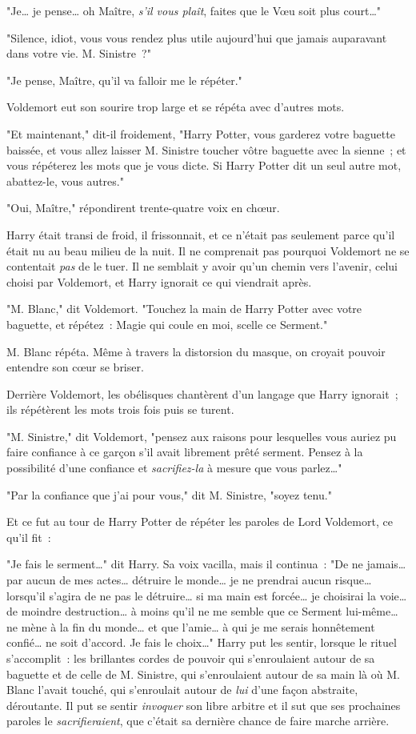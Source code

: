 "Je… je pense… oh Maître, \emph{s'il vous plaît}, faites que le Vœu soit plus court…"

"Silence, idiot, vous vous rendez plus utile aujourd'hui que jamais auparavant dans votre vie. M. Sinistre~?"

"Je pense, Maître, qu'il va falloir me le répéter."

Voldemort eut son sourire trop large et se répéta avec d'autres mots.

"Et maintenant," dit-il froidement, "Harry Potter, vous garderez votre baguette baissée, et vous allez laisser M. Sinistre toucher vôtre baguette avec la sienne~; et vous répéterez les mots que je vous dicte. Si Harry Potter dit un seul autre mot, abattez-le, vous autres."

"Oui, Maître," répondirent trente-quatre voix en chœur.

Harry était transi de froid, il frissonnait, et ce n'était pas seulement parce qu'il était nu au beau milieu de la nuit. Il ne comprenait pas pourquoi Voldemort ne se contentait \emph{pas} de le tuer. Il ne semblait y avoir qu'un chemin vers l'avenir, celui choisi par Voldemort, et Harry ignorait ce qui viendrait après.

"M. Blanc," dit Voldemort. "Touchez la main de Harry Potter avec votre baguette, et répétez~: Magie qui coule en moi, scelle ce Serment."

M. Blanc répéta. Même à travers la distorsion du masque, on croyait pouvoir entendre son cœur se briser.

Derrière Voldemort, les obélisques chantèrent d'un langage que Harry ignorait~; ils répétèrent les mots trois fois puis se turent.

"M. Sinistre," dit Voldemort, "pensez aux raisons pour lesquelles vous auriez pu faire confiance à ce garçon s'il avait librement prêté serment. Pensez à la possibilité d'une confiance et \emph{sacrifiez-la} à mesure que vous parlez…"

"Par la confiance que j'ai pour vous," dit M. Sinistre, "soyez tenu."

Et ce fut au tour de Harry Potter de répéter les paroles de Lord Voldemort, ce qu'il fit~:

"Je fais le serment…" dit Harry. Sa voix vacilla, mais il continua~: "De ne jamais… par aucun de mes actes… détruire le monde… je ne prendrai aucun risque… lorsqu'il s'agira de ne pas le détruire… si ma main est forcée… je choisirai la voie… de moindre destruction… à moins qu'il ne me semble que ce Serment lui-même… ne mène à la fin du monde… et que l'amie… à qui je me serais honnêtement confié… ne soit d'accord. Je fais le choix…" Harry put les sentir, lorsque le rituel s'accomplit~: les brillantes cordes de pouvoir qui s'enroulaient autour de sa baguette et de celle de M. Sinistre, qui s'enroulaient autour de sa main là où M. Blanc l'avait touché, qui s'enroulait autour de \emph{lui} d'une façon abstraite, déroutante. Il put se sentir \emph{invoquer} son libre arbitre et il sut que ses prochaines paroles le \emph{sacrifieraient}, que c'était sa dernière chance de faire marche arrière.

